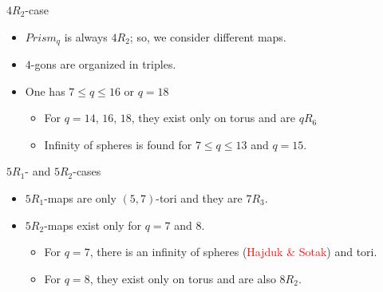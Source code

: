 \documentclass[%
pdf,
colorBG,
slideColor,
]{prosper}
\begin{document}
\begin{slide}{$4R_2$-case}
\begin{itemize}
\item $Prism_q$ is always $4R_2$; so, we consider different maps.
\item $4$-gons are organized in triples.
\item One has $7\leq q\leq 16$ or $q=18$
\begin{itemize}
\item For $q=14$, $16$, $18$, they exist only on torus and are $qR_6$
\item Infinity of spheres is found for $7\leq q\leq 13$ and $q=15$.
\end{itemize}
\end{itemize}
\begin{center}
\begin{minipage}{5cm}
\centering
{}\par
\end{minipage}
\end{center}



\end{slide}





\begin{slide}{$5R_1$- and $5R_2$-cases}
\begin{itemize}
\item $5R_1$-maps are only $(5,7)$-tori and they are $7R_3$.
\item $5R_2$-maps exist only for $q=7$ and $8$.
\begin{itemize}
\item For $q=7$, there is an infinity of spheres (\textcolor{red}{Hajduk \& Sotak}) and tori.
\begin{center}
\begin{minipage}{5.0cm}
\centering
{}\par
\end{minipage}
\begin{minipage}{5cm}
\centering
{}\par
\end{minipage}
\end{center}
\item For $q=8$, they exist only on torus and are also $8R_2$.
\end{itemize}

\end{itemize}

\end{slide}
\end{document}
